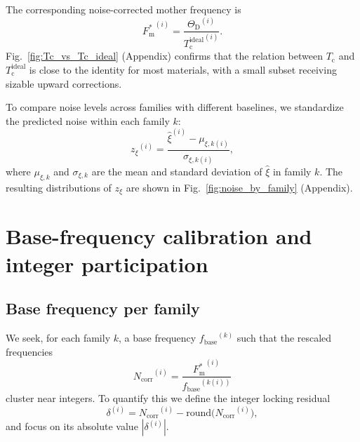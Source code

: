 \documentclass[aps,prb,twocolumn,superscriptaddress,floatfix,nofootinbib]{revtex4-2}
\newcommand{\Tc}{\ensuremath{T_{\mathrm{c}}}}
\newcommand{\Tcone}{\ensuremath{{T_{\mathrm{c}}^{\mathrm{ideal}}}}}
\newcommand{\ThetaD}{\ensuremath{\Theta_{\mathrm{D}}}}
\newcommand{\Fmstar}{\ensuremath{{F_{\mathrm{m}}^{\ast}}}}
\newcommand{\fbase}{\ensuremath{{f_{\mathrm{base}}}}}
\newcommand{\Ncorr}{\ensuremath{{N_{\mathrm{corr}}}}}
\newcommand{\deltalock}{\ensuremath{\delta}}
\newcommand{\znoise}{\ensuremath{{z_{\xi}}}}
\newcommand{\figref}[1]{Fig.~\ref{#1}}
\begin{document}
The corresponding noise-corrected mother frequency is
\begin{equation}
  \label{eq:Fm_star}
  \Fmstar^{(i)} = \frac{\ThetaD^{(i)}}{\Tcone^{(i)}}.
\end{equation}
\figref{fig:Tc_vs_Tc_ideal} (Appendix) confirms that the relation
between $\Tc$ and $\Tcone$ is close to the identity for most materials,
with a small subset receiving sizable upward corrections.

To compare noise levels across families with different baselines,
we standardize the predicted noise within each family $k$:
\begin{equation}
  \label{eq:z_noise}
  \znoise^{(i)} =
  \frac{\widehat{\xi}^{(i)} - \mu_{\xi,k(i)}}{\sigma_{\xi,k(i)}},
\end{equation}
where $\mu_{\xi,k}$ and $\sigma_{\xi,k}$ are the mean and
standard deviation of $\widehat{\xi}$ in family $k$.
The resulting distributions of $\znoise$ are shown in
\figref{fig:noise_by_family} (Appendix).

\section{Base-frequency calibration and integer participation}
\label{sec:methods}

\subsection{Base frequency per family}

We seek, for each family $k$, a base frequency $\fbase^{(k)}$
such that the rescaled frequencies
\begin{equation}
  \Ncorr^{(i)} = \frac{\Fmstar^{(i)}}{\fbase^{(k(i))}}
\end{equation}
cluster near integers.
To quantify this we define the integer locking residual
\begin{equation}
  \deltalock^{(i)} =
  \Ncorr^{(i)} - \mathrm{round}\!\bigl(\Ncorr^{(i)}\bigr),
\end{equation}
and focus on its absolute value $|\deltalock^{(i)}|$.
\end{document}
